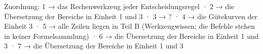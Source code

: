 
Zuordnung: 1 → das Rechenwerkzeug jeder Entscheidungsregel · 2 → die Übersetzung der Bereiche in Einheit 1 und 3 · 3 → ? · 4 → die Gütekurven der Einheit 3 · 5 → alle Zeilen liegen in Teil B (Werkzeugwissen; die Befehle stehen in keiner Formelsammlung) · 6 → die Übersetzung der Bereiche in Einheit 1 und 3 · 7 → die Übersetzung der Bereiche in Einheit 1 und 3

